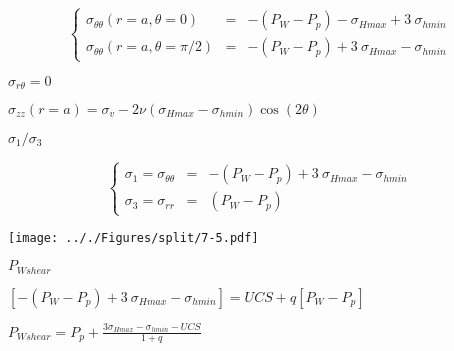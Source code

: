 \documentclass[onecolumn,11pt]{report}
\def\lthtmlcheckvsize{\ifdim\ht\sizebox<\vsize 
  \ifdim\wd\sizebox<\hsize\expandafter\hfill\fi \expandafter\vfill
  \else\expandafter\vss\fi}%
\begin{document}
{\newpage\clearpage
{}%
\begin{displaymath}\left\lbrace
\begin{array}{rcl}
\sigma_{\theta \theta} (r=a,\theta=0) & = &
-(P_W - P_p) -\sigma_{Hmax} + 3 \: \sigma_{hmin} \\
\sigma_{\theta \theta} (r=a,\theta=\pi/2) & = &
-(P_W - P_p) +3 \: \sigma_{Hmax} -\sigma_{hmin}
\end{array}
\right.\end{displaymath}%
\lthtmldisplayZ
\lthtmlcheckvsize\clearpage}

{\newpage\clearpage
{}%
$ \sigma_{r \theta} = 0$%
\lthtmlindisplaymathZ
\lthtmlcheckvsize\clearpage}

{\newpage\clearpage
{}%
$\displaystyle \sigma_{zz} (r=a) =  \sigma_v - 2\nu (\sigma_{Hmax}-\sigma_{hmin}) \cos (2\theta)$%
\lthtmlindisplaymathZ
\lthtmlcheckvsize\clearpage}

{\newpage\clearpage
{}%
$ \sigma_1/\sigma_3$%
\lthtmlindisplaymathZ
\lthtmlcheckvsize\clearpage}

{\newpage\clearpage
{}%
\begin{displaymath}\left\lbrace
\begin{array}{rcl}
\sigma_1 = \sigma_{\theta \theta} & = &
-(P_W - P_p) +3 \: \sigma_{Hmax} -\sigma_{hmin} \\
\sigma_3 = \sigma_{rr} & = & (P_W - P_p)
\end{array}
\right.\end{displaymath}%
\lthtmldisplayZ
\lthtmlcheckvsize\clearpage}

{\newpage\clearpage
{}%
\texttt{[image: .././Figures/split/7-5.pdf]}%
\lthtmlpictureZ
\lthtmlcheckvsize\clearpage}

{\newpage\clearpage
{}%
$ P_{Wshear}$%
\lthtmlindisplaymathZ
\lthtmlcheckvsize\clearpage}

{\newpage\clearpage
{}%
$\displaystyle \left[
-(P_W - P_p) +3 \: \sigma_{Hmax} -\sigma_{hmin}
\right] = UCS + q \left[ P_W - P_p \right]$%
\lthtmlindisplaymathZ
\lthtmlcheckvsize\clearpage}

{\newpage\clearpage
{}%
$\displaystyle P_{Wshear} = P_p + \frac{3\sigma_{Hmax} -\sigma_{hmin}
- UCS}{1+q}$%
\lthtmlindisplaymathZ
\lthtmlcheckvsize\clearpage}
\end{document}
